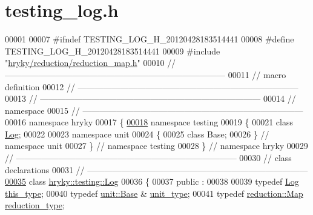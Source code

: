 \hypertarget{testing__log_8h_source}{\section{testing\-\_\-log.\-h}
}

\begin{DoxyCode}
00001 
00007 \textcolor{preprocessor}{#ifndef TESTING\_LOG\_H\_20120428183514441}
00008 \textcolor{preprocessor}{}\textcolor{preprocessor}{#define TESTING\_LOG\_H\_20120428183514441}
00009 \textcolor{preprocessor}{}\textcolor{preprocessor}{#include "\hyperlink{reduction__map_8h}{hryky/reduction/reduction_map.h}"}
00010 \textcolor{comment}{//
      ------------------------------------------------------------------------------}
00011 \textcolor{comment}{// macro definition}
00012 \textcolor{comment}{//
      ------------------------------------------------------------------------------}
00013 \textcolor{comment}{//
      ------------------------------------------------------------------------------}
00014 \textcolor{comment}{// namespace}
00015 \textcolor{comment}{//
      ------------------------------------------------------------------------------}
00016 \textcolor{keyword}{namespace }hryky
00017 \{
\hypertarget{testing__log_8h_source_l00018}{}\hyperlink{namespacehryky_1_1testing}{00018} \textcolor{keyword}{namespace }testing
00019 \{
00021     \textcolor{keyword}{class }\hyperlink{classhryky_1_1testing_1_1_log}{Log};
00022 
00023 \textcolor{keyword}{namespace }unit
00024 \{
00025     \textcolor{keyword}{class }Base;
00026 \} \textcolor{comment}{// namespace unit}
00027 \} \textcolor{comment}{// namespace testing}
00028 \} \textcolor{comment}{// namespace hryky}
00029 \textcolor{comment}{//
      ------------------------------------------------------------------------------}
00030 \textcolor{comment}{// class declarations}
00031 \textcolor{comment}{//
      ------------------------------------------------------------------------------}
\hypertarget{testing__log_8h_source_l00035}{}\hyperlink{classhryky_1_1testing_1_1_log}{00035} \textcolor{comment}{}\textcolor{keyword}{class }\hyperlink{classhryky_1_1testing_1_1_log}{hryky::testing::Log}
00036 \{
00037 \textcolor{keyword}{public} :
00038 
00039     \textcolor{keyword}{typedef} \hyperlink{classhryky_1_1testing_1_1_log}{Log}                     \hyperlink{classhryky_1_1testing_1_1_log}{this_type};
00040     \textcolor{keyword}{typedef} \hyperlink{classhryky_1_1testing_1_1unit_1_1_base}{unit::Base} &            \hyperlink{classhryky_1_1testing_1_1unit_1_1_base}{unit_type};
00041     \textcolor{keyword}{typedef} \hyperlink{classhryky_1_1reduction_1_1_map}{reduction::Map}        \hyperlink{classhryky_1_1reduction_1_1_map}{reduction_type};

\end{DoxyCode}
